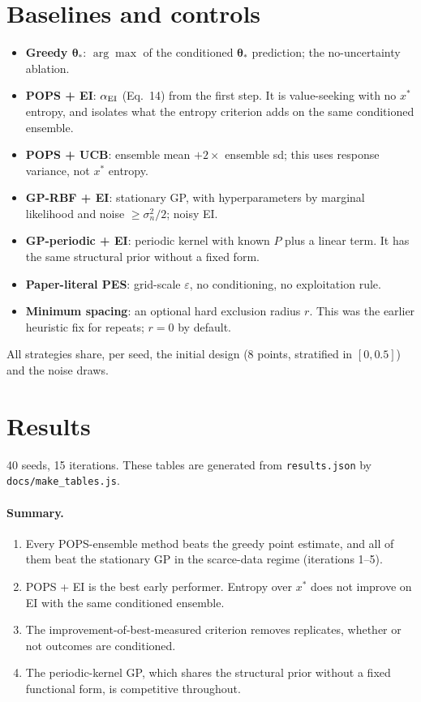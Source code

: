 \documentclass[11pt,a4paper]{article}
\newcommand{\btheta}{\bm{\theta}}
\begin{document}
\section{Baselines and controls}
\begin{itemize}[itemsep=1pt]
\item \textbf{Greedy $\btheta_*$}: $\arg\max$ of the conditioned $\btheta_*$ prediction; the no-uncertainty ablation.
\item \textbf{POPS + EI}: $\alpha_{\rm EI}$ (Eq.~14) from the first step. It is value-seeking with no $x^*$ entropy, and isolates what the entropy criterion adds on the same conditioned ensemble.
\item \textbf{POPS + UCB}: ensemble mean $+2\times$ ensemble sd; this uses response variance, not $x^*$ entropy.
\item \textbf{GP-RBF + EI}: stationary GP, with hyperparameters by marginal likelihood and noise $\ge\sigma_n^2/2$; noisy EI.
\item \textbf{GP-periodic + EI}: periodic kernel with known $P$ plus a linear term. It has the same structural prior without a fixed form.
\item \textbf{Paper-literal PES}: grid-scale $\varepsilon$, no conditioning, no exploitation rule.
\item \textbf{Minimum spacing}: an optional hard exclusion radius $r$. This was the earlier heuristic fix for repeats; $r=0$ by default.
\end{itemize}
All strategies share, per seed, the initial design (8 points, stratified in $[0,0.5]$) and the noise draws.

\section{Results}
\label{sec:results}
40 seeds, 15 iterations. These tables are generated from \texttt{results.json} by \texttt{docs/make\_tables.js}.

\paragraph{Summary.}
\begin{enumerate}[itemsep=1pt]
\item Every POPS-ensemble method beats the greedy point estimate, and all of them beat the stationary GP in the scarce-data regime (iterations 1--5).
\item POPS + EI is the best early performer. Entropy over $x^*$ does not improve on EI with the same conditioned ensemble.
\item The improvement-of-best-measured criterion removes replicates, whether or not outcomes are conditioned.
\item The periodic-kernel GP, which shares the structural prior without a fixed functional form, is competitive throughout.
\end{enumerate}

\end{document}

